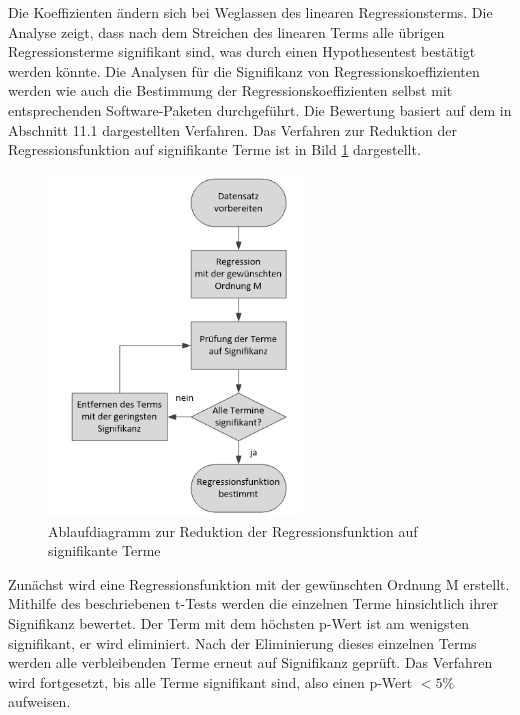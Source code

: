 \noindent Die Koeffizienten \"{a}ndern sich bei Weglassen des linearen Regressionsterms. Die Analyse zeigt, dass nach dem Streichen des linearen Terms alle \"{u}brigen Regressionsterme signifikant sind, was durch einen Hypothesentest best\"{a}tigt werden k\"{o}nnte. Die Analysen f\"{u}r die Signifikanz von Regressionskoeffizienten werden wie auch die Bestimmung der Regressionskoeffizienten selbst mit entsprechenden Software-Paketen durchgef\"{u}hrt. Die Bewertung basiert auf dem in Abschnitt 11.1 dargestellten Verfahren. Das Verfahren zur Reduktion der Regressionsfunktion auf signifikante Terme ist in Bild \ref{fig:AblaufdiagrammReduktionRegressionsfunktion} dargestellt.

\noindent 
\begin{figure}[H]
  \centerline{\includegraphics[width=0.6\textwidth]{Kapitel12/Bilder/image12}}
  \caption{Ablaufdiagramm zur Reduktion der Regressionsfunktion auf signifikante Terme}
  \label{fig:AblaufdiagrammReduktionRegressionsfunktion}
\end{figure}

\noindent Zun\"{a}chst wird eine Regressionsfunktion mit der gew\"{u}nschten Ordnung M erstellt. Mithilfe des beschriebenen t-Tests werden die einzelnen Terme hinsichtlich ihrer Signifikanz bewertet. Der Term mit dem h\"{o}chsten p-Wert ist am wenigsten signifikant, er wird eliminiert. Nach der Eliminierung dieses einzelnen Terms werden alle verbleibenden Terme erneut auf Signifikanz gepr\"{u}ft. Das Verfahren wird fortgesetzt, bis alle Terme signifikant sind, also einen p-Wert $< 5 \%$ aufweisen.

